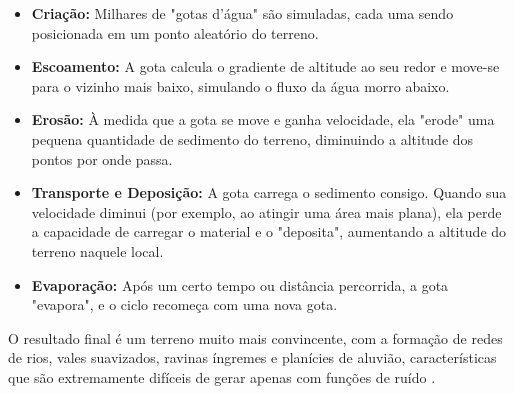 \begin{itemize}
    \item \textbf{Criação:} Milhares de "gotas d'água" são simuladas, cada uma sendo posicionada em um ponto aleatório do terreno.

    \item \textbf{Escoamento:} A gota calcula o gradiente de altitude ao seu redor e move-se para o vizinho mais baixo, simulando o fluxo da água morro abaixo.

    \item \textbf{Erosão:} À medida que a gota se move e ganha velocidade, ela "erode" uma pequena quantidade de sedimento do terreno, diminuindo a altitude dos pontos por onde passa.

    \item \textbf{Transporte e Deposição:} A gota carrega o sedimento consigo. Quando sua velocidade diminui (por exemplo, ao atingir uma área mais plana), ela perde a capacidade de carregar o material e o "deposita", aumentando a altitude do terreno naquele local.

    \item \textbf{Evaporação:} Após um certo tempo ou distância percorrida, a gota "evapora", e o ciclo recomeça com uma nova gota.
\end{itemize}

O resultado final é um terreno muito mais convincente, com a formação de redes de rios, vales suavizados, ravinas íngremes e planícies de aluvião, características que são extremamente difíceis de gerar apenas com funções de ruído \cite{erosion}.

